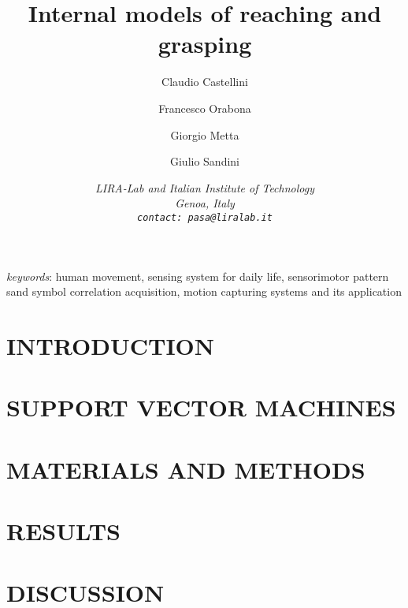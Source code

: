 \documentclass{arsubmit}
\title{Internal models of reaching and grasping}
\author{Claudio Castellini \and Francesco Orabona \and Giorgio Metta \and Giulio Sandini}
\date{\small \it{
LIRA-Lab and Italian Institute of Technology\\
Genoa, Italy\\
{\tt contact: pasa@liralab.it}
}}
\begin{document}
\maketitle

\begin{abstract}

\end{abstract}

{\it keywords}: human movement, sensing system for daily life,
sensorimotor pattern sand symbol correlation acquisition, motion
capturing systems and its application

\section{INTRODUCTION}
\label{sec:introduction}


\section{SUPPORT VECTOR MACHINES}
\label{sec:svm}


\section{MATERIALS AND METHODS}
\label{sec:exp_desc}


\section{RESULTS}
\label{sec:exp_res}


\section{DISCUSSION}
\label{sec:Conclusions}


{\small


}
\end{document}
